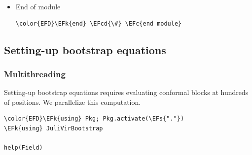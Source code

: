 \documentclass[a4paper]{article}
\numberwithin{equation}{section}
\newcommand{\EFc}[1]{\textcolor{EFc}{#1}} %
\newcommand{\EFcd}[1]{\textcolor{EFcd}{#1}} %
\newcommand{\EFs}[1]{\textcolor{EFs}{#1}} %
\newcommand{\EFk}[1]{\textcolor{EFk}{#1}} %
\newcommand{\EFf}[1]{\textcolor{EFf}{#1}} %
\newcommand{\EFt}[1]{\textcolor{EFt}{#1}} %
\begin{document}
\begin{itemize}
\begin{Code}
\begin{Verbatim}
\EFs{"""}
    \EFs{block\_chiral\_schan(block::FourPointBlockSphere, corr::FourPointCorrelation, x, lr)}

\EFs{Compute the chiral conformal block}

\EFs{``\char92{}\char92{}mathcal F\char94{}\{\char92{}text\{torus\}\}\_\{\char92{}\char92{}delta\}(x)``}

\EFs{"""}
\EFk{function} \EFf{block\_chiral}(τ, Nmax, block\EFt{::OnePointBlockTorus}, corr\EFt{::OnePointCorrelation}, lr)
    δ = block.channelField[\EFs{"δ"}][lr]
    \EFk{return} q\EFt{\char94{}}δ\EFt{/}η(τ) \EFt{*} H(qfromtau(τ), Nmax, block, corr, lr)
\EFk{end}

\EFs{"""}
\EFs{Compute the non-chiral conformal block}

\EFs{`` \char92{}\char92{}mathcal F\_\{\char92{}\char92{}Delta\}\char94{}\{(\char92{}\char92{}text\{chan\})\}(\char92{}\char92{}Delta\_i| x)``}

\EFs{where ``\char92{}\char92{}text\{chan\}`` is `s`,`t` or `u`.}

\textcolor[HTML]{ff8e00}{\textbf{TODO:}} \EFs{logarithmic blocks}
\EFs{"""}
\EFk{function} \EFf{F\_one\_point\_torus}(τ, Nmax, block\EFt{::OnePointBlockTorus}, corr\EFt{::OnePointCorrelation})
    block\_chiral(τ, Nmax, block, corr, left) \EFt{*} conj(block\_chiral(conj(τ), Nmax, block, corr, right))
\EFk{end}
\end{Verbatim}
\end{Code}
\item End of module
\label{sec:orgbb1ca86}

\begin{Code}
\begin{Verbatim}
\color{EFD}\EFk{end} \EFcd{\#} \EFc{end module}
\end{Verbatim}
\end{Code}
\end{itemize}
\subsection{Setting-up bootstrap equations}
\label{sec:org9e4edec}
\subsubsection*{Multithreading}
\label{sec:orgba418fb}

Setting-up bootstrap equations requires evaluating conformal blocks at hundreds of positions. We parallelize this computation.

\begin{Code}
\begin{Verbatim}
\color{EFD}\EFk{using} Pkg; Pkg.activate(\EFs{"."})
\EFk{using} JuliVirBootstrap

help(Field)
\end{Verbatim}
\end{Code}
\end{document}
